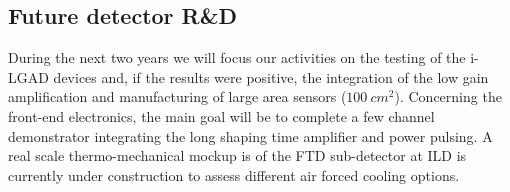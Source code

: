 \subsection{Future detector R\&D}
During the next two years we will focus our activities on the testing of the i-LGAD devices and, if the results were positive, the integration of the low gain amplification and manufacturing of large area sensors ($\SI{100}{cm^2}$). Concerning the front-end electronics, the main goal will be to complete a few channel demonstrator integrating the long shaping time amplifier and power pulsing. A real scale thermo-mechanical mockup is of the FTD sub-detector at ILD is currently under construction to assess different air forced cooling options.
